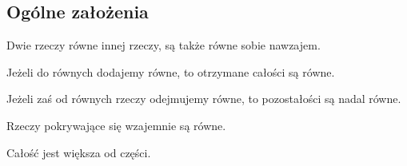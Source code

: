 \documentclass[12pt, a4paper]{scrartcl}
\begin{document}
\begin{figure}[!h]
    \begin{center}
    \end{center}
\end{figure}

\subsection*{Ogólne założenia}

\begin{commons}
    \item Dwie rzeczy równe innej rzeczy, są także równe sobie nawzajem.
    \item Jeżeli do równych dodajemy równe, to otrzymane całości są równe.
    \item Jeżeli zaś od równych rzeczy odejmujemy równe, to pozostałości są
        nadal równe.
    \item Rzeczy pokrywające się wzajemnie są równe.
    \item Całość jest większa od części.
\end{commons}

\pagebreak
\end{document}
